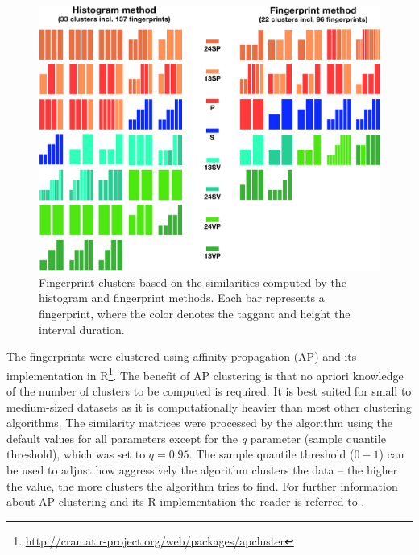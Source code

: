 \documentclass[thesis.tex]{subfiles}
\begin{document}
\begin{figure}[h]
\label{figure:clusters}
\centering \includegraphics[page=1,width=\textwidth,height=\textheight,keepaspectratio=true]{images/experiment/clusters}
\caption{Fingerprint clusters based on the similarities computed by the histogram and fingerprint methods. Each bar represents a fingerprint, where the color denotes the taggant and height the interval duration.}
\end{figure}

The fingerprints were clustered using affinity propagation (AP) and its implementation in R\footnote{\url{http://cran.at.r-project.org/web/packages/apcluster}}. The benefit of AP clustering is that no apriori knowledge of the number of clusters to be computed is required. It is best suited for small to medium-sized datasets as it is computationally heavier than most other clustering algorithms. The similarity matrices were processed by the algorithm using the default values for all parameters except for the \emph{q} parameter (sample quantile threshold), which was set to $q=0.95$. The sample quantile threshold ($0-1$) can be used to adjust how aggressively the algorithm clusters the data -- the higher the value, the more clusters the algorithm tries to find. For further information about AP clustering and its R implementation the reader is referred to \cite{affinity_propagation}.
\end{document}
